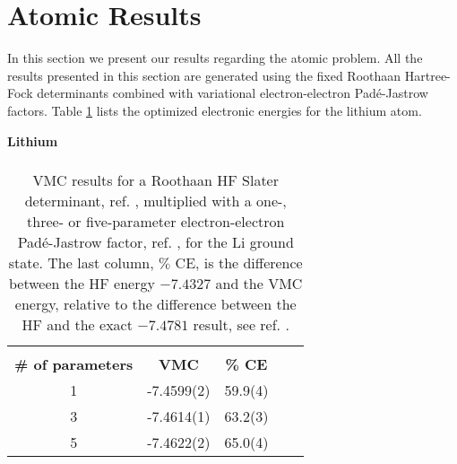 %
%
\section{Atomic Results}
\label{AtomicResults}

In this section we present our results regarding the atomic
problem. All the results presented in this section are generated using
the fixed Roothaan Hartree-Fock determinants combined with variational
electron-electron Pad\'{e}-Jastrow factors. Table
\ref{litiumPadeJastrow} lists the optimized electronic energies for
the lithium atom. 
\newline

\begin{table}[hbtp]
\begin{center} {\large \bf Lithium} \\ 
$\phantom{a}$ \\
\begin{tabular}{ccccc}
\hline\\ 
{\bf \# of parameters} &     {\bf VMC}    & {\bf \% CE} \\
1                     &       -7.4599(2) &  59.9(4) \\   
3                     &       -7.4614(1) &  63.2(3) \\   
5                     &       -7.4622(2) &  65.0(4) \\   [10pt]  
\hline
\end{tabular} 
\end{center}
\caption{VMC results for a Roothaan HF Slater determinant,
  ref. \cite{clementi1974}, multiplied with a one-, three- or
  five-parameter electron-electron Pad\'{e}-Jastrow factor,
  ref. \cite{hammond1994}, for the Li ground state.
  The last column, $\%$ CE, is the difference between the HF
  energy $-7.4327$ and the VMC energy, relative to the difference
  between the HF and the exact $-7.4781$ result, see
  ref. \cite{hammond1994}.}
\label{litiumPadeJastrow}
\end{table}

